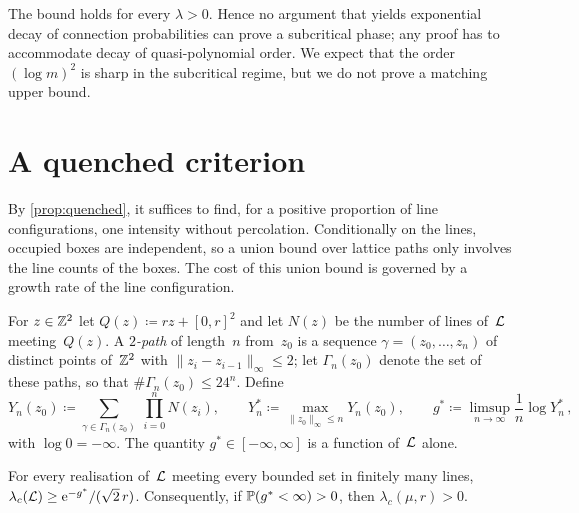 \documentclass[11pt,letterpaper]{article}
\begin{document}
The bound holds for every $\lambda>0$. Hence no argument that yields exponential decay of connection probabilities can prove a subcritical phase; any proof has to accommodate decay of quasi-polynomial order. We expect that the order $(\log m)^2$ is sharp in the subcritical regime, but we do not prove a matching upper bound.

\section{A quenched criterion}
\label{sec:criterion}

By \cref{prop:quenched}, it suffices to find, for a positive proportion of line configurations, one intensity without percolation. Conditionally on the lines, occupied boxes are independent, so a union bound over lattice paths only involves the line counts of the boxes. The cost of this union bound is governed by a growth rate of the line configuration.

For $z\in\Z^2$ let $Q(z)\coloneqq rz+[0,r]^2$ and let $N(z)$ be the number of lines of~$\cL$ meeting~$Q(z)$. A \emph{$2$-path} of length~$n$ from~$z_0$ is a sequence $\gamma=(z_0,\dots,z_n)$ of distinct points of~$\Z^2$ with $\lVert z_i-z_{i-1}\rVert_\infty\le2$; let $\Gamma_n(z_0)$ denote the set of these paths, so that $\#\Gamma_n(z_0)\le24^n$. Define
\begin{equation*}
  Y_n(z_0)\coloneqq\sum_{\gamma\in\Gamma_n(z_0)}\ \prod_{i=0}^nN(z_i),\qquad Y_n^*\coloneqq\max_{\lVert z_0\rVert_\infty\le n}Y_n(z_0),\qquad g^*\coloneqq\limsup_{n\to\infty}\frac1n\log Y_n^*\,,
\end{equation*}
with $\log0=-\infty$. The quantity $g^*\in[-\infty,\infty]$ is a function of~$\cL$ alone.

\begin{theorem}
\label{thm:criterion}
For every realisation of~$\cL$ meeting every bounded set in finitely many lines, $\lambda_c(\cL)\ge\e^{-g^*}/(\sqrt2\,r)$. Consequently, if $\P(g^*<\infty)>0$, then $\lambda_c(\mu,r)>0$.
\end{theorem}
\end{document}
